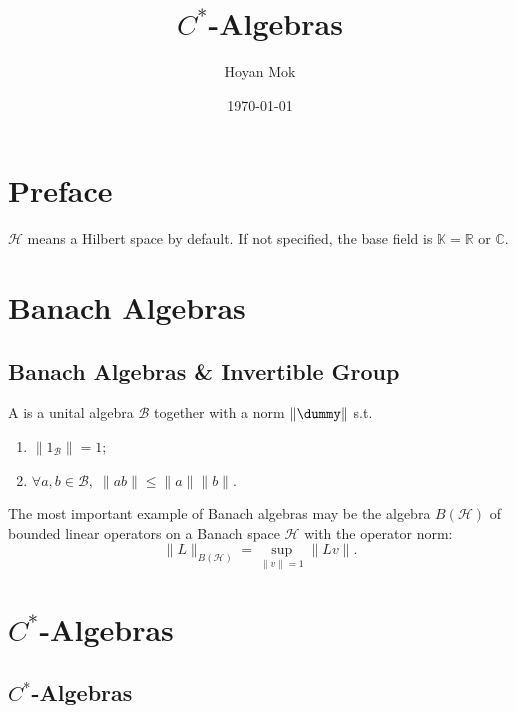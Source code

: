\documentclass[openany, a5paper]{book}
\title{$C^*$-Algebras}
\author{Hoyan Mok}
\date{\today} %
\begin{document}
\maketitle %
\frontmatter
\chapter{Preface}

$\mathcal H$ means a Hilbert space by default.
If not specified, the base field is $\mathbb K = \mathbb R$ or $\mathbb C$.


\tableofcontents

\mainmatter
\chapter{Banach Algebras}
\section{Banach Algebras \& Invertible Group}

\begin{definition}
    A  is a unital algebra $\mathscr B$ together with a norm $\|\dummy\|$ s.t.\
    \begin{enumerate}
        \item $\|1_{\mathscr B}\| = 1$;
        \item $\forall a, b \in \mathscr B,\; \|ab\| \leq \|a\| \|b\|$.
    \end{enumerate}
\end{definition}

The most important example of Banach algebras may be the algebra $B(\mathcal H)$ of bounded linear operators on a Banach space $\mathcal H$ with the operator norm:
\begin{equation}
    \|L\|_{B(\mathcal H)} = \sup_{\|v\| = 1} \|Lv\|.
\end{equation}


\chapter{\texorpdfstring{$C^*$-Algebras}{C*-Algebras}}
\section{\texorpdfstring{$C^*$-Algebras}{C*-Algebras}}
\end{document}
